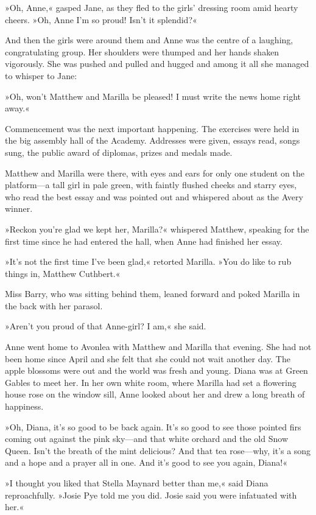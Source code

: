 »Oh, Anne,« gasped Jane, as they fled to the girls’ dressing room amid hearty cheers. »Oh, Anne I’m so proud! Isn’t it splendid?«

And then the girls were around them and Anne was the centre of a laughing, congratulating group. Her shoulders were thumped and her hands shaken vigorously. She was pushed and pulled and hugged and among it all she managed to whisper to Jane:

»Oh, won’t Matthew and Marilla be pleased! I must write the news home right away.«

Commencement was the next important happening. The exercises were held in the big assembly hall of the Academy. Addresses were given, essays read, songs sung, the public award of diplomas, prizes and medals made.

Matthew and Marilla were there, with eyes and ears for only one student on the platform—a tall girl in pale green, with faintly flushed cheeks and starry eyes, who read the best essay and was pointed out and whispered about as the Avery winner.

»Reckon you’re glad we kept her, Marilla?« whispered Matthew, speaking for the first time since he had entered the hall, when Anne had finished her essay.

»It’s not the first time I’ve been glad,« retorted Marilla. »You do like to rub things in, Matthew Cuthbert.«

Miss Barry, who was sitting behind them, leaned forward and poked Marilla in the back with her parasol.

»Aren’t you proud of that Anne-girl? I am,« she said.

Anne went home to Avonlea with Matthew and Marilla that evening. She had not been home since April and she felt that she could not wait another day. The apple blossoms were out and the world was fresh and young. Diana was at Green Gables to meet her. In her own white room, where Marilla had set a flowering house rose on the window sill, Anne looked about her and drew a long breath of happiness.

»Oh, Diana, it’s so good to be back again. It’s so good to see those pointed firs coming out against the pink sky—and that white orchard and the old Snow Queen. Isn’t the breath of the mint delicious? And that tea rose—why, it’s a song and a hope and a prayer all in one. And it’s good to see you again, Diana!«

»I thought you liked that Stella Maynard better than me,« said Diana reproachfully. »Josie Pye told me you did. Josie said you were infatuated with her.«

